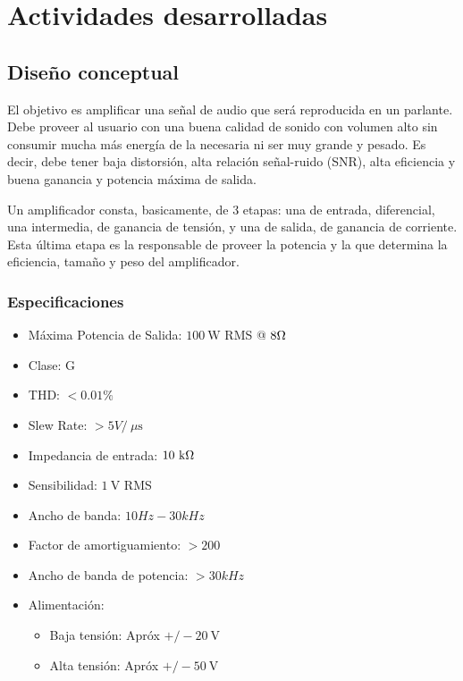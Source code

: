 \documentclass[a4paper,12pt,twoside]{article}
\newcommand{\volt}{\ensuremath{~\mathrm{V}}}
\newcommand{\kohm}{\ensuremath{~\mathrm{k}\ohm}}
\newcommand{\uS}{\ensuremath{~\mu\mathrm{s}}}
\newcommand{\watt}{\ensuremath{~\mathrm{W}}}
\begin{document}


\newpage
\vfill
\tableofcontents
\vfill

\listoffixmes

\newpage

\section{Actividades desarrolladas}

\subsection{Diseño conceptual}



El objetivo es amplificar una señal de audio que será reproducida en un parlante.  Debe proveer al usuario con una buena calidad de sonido con volumen alto sin consumir mucha más energía de la necesaria ni ser muy grande y pesado. Es decir, debe tener baja distorsión, alta relación señal-ruido (SNR), alta eficiencia y buena ganancia y potencia máxima de salida.

Un amplificador consta, basicamente, de 3 etapas: una de entrada, diferencial, una intermedia, de ganancia de tensión, y una de salida, de ganancia de corriente. Esta última etapa es la responsable de proveer la potencia y la que determina la eficiencia, tamaño y peso del amplificador. 

\subsubsection{Especificaciones}

\bigskip

\begin{itemize}
	\item Máxima Potencia de Salida:  $100\watt$ RMS @ $8\ohm$
	\item Clase: G
	\item THD: $<0.01 \%$  %
	\item Slew Rate: $>5V / \uS$
	\item Impedancia de entrada: $10\kohm$
	\item Sensibilidad: $1\volt$ RMS
	\item Ancho de banda: $10 Hz-30kHz$
	\item Factor de amortiguamiento: $>200$
	\item Ancho de banda de potencia: $>30kHz$
	\item Alimentación: 
	\begin{itemize}
		\item Baja tensión: Apróx $ +/-20\volt$ 
		\item Alta tensión: Apróx $ +/-50\volt$
	\end{itemize}
\end{itemize}
\end{document}
